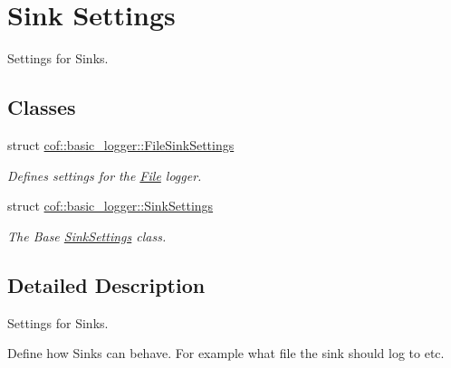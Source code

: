 \hypertarget{group___sinks___settings}{}\section{Sink Settings}
\label{group___sinks___settings}


Settings for Sinks.  


\subsection*{Classes}
\begin{DoxyCompactItemize}
\item 
struct \hyperlink{structcof_1_1basic__logger_1_1_file_sink_settings}{cof\+::basic\+\_\+logger\+::\+File\+Sink\+Settings}
\begin{DoxyCompactList}\small\item\em Defines settings for the \hyperlink{classcof_1_1basic__logger_1_1_file}{File} logger. \end{DoxyCompactList}\item 
struct \hyperlink{structcof_1_1basic__logger_1_1_sink_settings}{cof\+::basic\+\_\+logger\+::\+Sink\+Settings}
\begin{DoxyCompactList}\small\item\em The Base \hyperlink{structcof_1_1basic__logger_1_1_sink_settings}{Sink\+Settings} class. \end{DoxyCompactList}\end{DoxyCompactItemize}


\subsection{Detailed Description}
Settings for Sinks. 

Define how Sinks can behave. For example what file the sink should log to etc. 